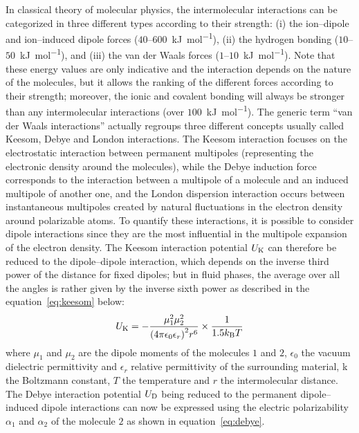\documentclass[main.tex]{subfiles}
\begin{document}
In classical theory of molecular physics, the intermolecular interactions can be categorized in three different types according to their strength: (i) the ion--dipole and ion--induced dipole forces ($40$--$600$~\si{\kilo\joule\per\mol}), (ii) the hydrogen bonding ($10$--$50$~\si{\kilo\joule\per\mol}), and (iii) the van der Waals forces ($1$--$10$~\si{\kilo\joule\per\mol}). Note that these energy values are only indicative and the interaction depends on the nature of the molecules, but it allows the ranking of the different forces according to their strength; moreover, the ionic and covalent bonding will always be stronger than any intermolecular interactions (over $100$~\si{\kilo\joule\per\mol}). The generic term ``van der Waals interactions'' actually regroups three different concepts usually called Keesom, Debye and London interactions. The Keesom interaction focuses on the electrostatic interaction between permanent multipoles (representing the electronic density around the molecules),\autocite{keesom1915second} while the Debye induction force corresponds to the interaction between a multipole of a molecule and an induced multipole of another one,\autocite{Roberts_1938} and the London dispersion interaction occurs between instantaneous multipoles created by natural fluctuations in the electron density around polarizable atoms.\autocite{london1930theorie,polanyi1932section} To quantify these interactions, it is possible to consider dipole interactions since they are the most influential in the multipole expansion of the electron density. The Keesom interaction potential $U_{\text{K}}$ can therefore be reduced to the dipole--dipole interaction, which depends on the inverse third power of the distance for fixed dipoles; but in fluid phases, the average over all the angles is rather given by the inverse sixth power as described in the equation~\ref{eq:keesom} below:
\begin{equation}\label{eq:keesom}
  U_{\text{K}} = -\dfrac{\mu_1^2\mu_2^2}{{(4\pi\epsilon_0\epsilon_r)}^2r^6}\times\dfrac{1}{ 1.5k_{\text{B}}T}
\end{equation}
where $\mu_1$ and $\mu_2$ are the dipole moments of the molecules $1$ and $2$, $\epsilon_0$ the vacuum dielectric permittivity and $\epsilon_r$ relative permittivity of the surrounding material, k the Boltzmann constant, $T$ the temperature and $r$ the intermolecular distance. The Debye interaction potential $U_{\text{D}}$ being reduced to the permanent dipole--induced dipole interactions can now be expressed using the electric polarizability $\alpha_1$ and $\alpha_2$ of the molecule $2$ as shown in equation~\ref{eq:debye}.
\end{document}
